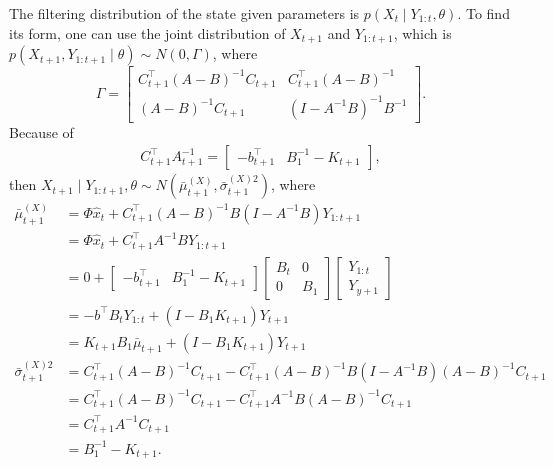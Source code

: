 The filtering distribution of the state given parameters is $p(X_t\mid Y_{1:t}, \theta )$. To find its form, one can use the joint distribution of $X_{t+1}$ and $Y_{1:t+1}$, which is $p(X_{t+1}, Y_{1:t+1}  \mid  \theta)\sim N(0,\Gamma)$, where
\begin{equation*}
\Gamma=\begin{bmatrix} C_{t+1}^\top(A-B)^{-1}C_{t+1} & C_{t+1}^\top(A-B)^{-1}\\(A-B)^{-1}C_{t+1} & (I-A^{-1}B)^{-1}B^{-1} \end{bmatrix}.
\end{equation*}
Because of 
\begin{align*}
C_{t+1}^\top A_{t+1}^{-1} = \left[\begin{matrix} - b_{t+1}^\top & B_1^{-1}- K_{t+1} \end{matrix} \right],
\end{align*}
then $X_{t+1}\mid Y_{1:t+1},\theta \sim N(\bar{\mu}_{t+1}^{(X)},\bar{\sigma}_{t+1}^{(X)2})$, where
\begin{align*}
\bar{\mu}_{t+1}^{(X)}       &= \Phi \hat{x}_{t} +  C_{t+1}^\top (A-B)^{-1}B (I-A^{-1}B)Y_{1:t+1}\\
                      &= \Phi \hat{x}_{t} +  C_{t+1}^\top A^{-1}B Y_{1:t+1} \\ 
                      &=0+ \begin{bmatrix} - b_{t+1}^\top & B_1^{-1}-K_{t+1} \end{bmatrix}\begin{bmatrix} B_t & 0 \\ 0 & B_1 \end{bmatrix} \begin{bmatrix} Y_{1:t} \\ Y_{y+1} \end{bmatrix} \\
                      &=   -b^\top B_t Y_{1:t} + (I - B_1K_{t+1})Y_{t+1} \\
                      & =  K_{t+1}B_1\bar{\mu}_{t+1 } + (I - B_1K_{t+1})Y_{t+1}  \\
\bar{\sigma}_{t+1}^{(X)2}&=C_{t+1}^\top(A-B)^{-1}C_{t+1}-  C_{t+1}^\top(A-B)^{-1}  B(I-A^{-1}B) (A-B)^{-1}C_{t+1}\\
                      &= C_{t+1}^\top(A-B)^{-1}C_{t+1} -  C_{t+1}^\top A^{-1}B(A-B)^{-1}C_{t+1}\\
                      &= C_{t+1}^\top A^{-1}C_{t+1} \\ &=B_1^{-1}-K_{t+1}.
\end{align*}

